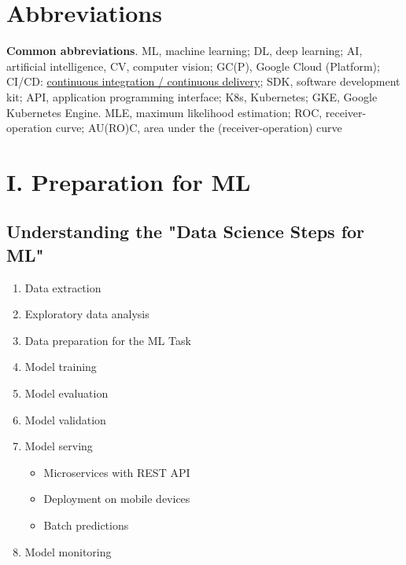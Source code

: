 \documentclass[10pt,landscape,letterpaper]{cheatsheet}
\begin{document}
\begin{multicols}{3}

\section{Abbreviations}

\textbf{Common abbreviations}. ML, machine learning; DL, deep learning; AI, artificial intelligence, CV, computer vision; GC(P), Google Cloud (Platform); CI/CD: \href{https://www.redhat.com/en/topics/devops/what-is-ci-cd}{continuous integration / continuous delivery}; SDK, software development kit; API, application programming interface; K8s, Kubernetes; GKE, Google Kubernetes Engine. MLE, maximum likelihood estimation; ROC, receiver-operation curve; AU(RO)C, area under the (receiver-operation) curve

\section{I. Preparation for ML}

\subsection{Understanding the "Data Science Steps for ML"}

\begin{enumerate}
    \item Data extraction
    \item Exploratory data analysis
    \item Data preparation for the ML Task
    \item Model training
    \item Model evaluation
    \item Model validation
    \item Model serving
    \begin{itemize}
        \item Microservices with REST API
        \item Deployment on mobile devices
        \item Batch predictions
    \end{itemize}
    \item Model monitoring
\end{enumerate}


\end{multicols}
\end{document}
